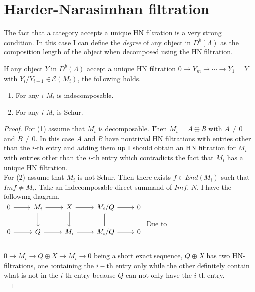 \section{Harder-Narasimhan filtration}
\indent The fact that a category accepts a unique HN filtration is a very strong condition. In this case I can define the \textit{degree} of any object in $D^b(\Lambda)$ as the composition length of the object when decomposed using the HN filtration.\\
\begin{lemma}
If any object $Y$ in $D^b(\Lambda)$ accept a unique HN filtration $0\to Y_m\to\cdots\to Y_1=Y$ with $Y_i/Y_{i+1}\in \mathcal{E}(M_i)$, the following holds.
\begin{enumerate}
\item For any $i$ $M_i$ is indecomposable.
\item For any $i$ $M_i$ is Schur.
\end{enumerate}
\end{lemma}
\begin{proof}
\indent For (1) assume that $M_i$ is decomposable. Then $M_i = A\oplus B$ with $A\neq 0$ and $B\neq 0$. In this case $A$ and $B$ have nontrivial HN filtrations with entries other than the $i$-th entry and adding them up I should obtain an HN filtration for $M_i$ with entries other than the $i$-th entry which contradicts the fact that $M_i$ has a unique HN filtration.\\
\indent For (2) assume that $M_i$ is not Schur. Then there exists $f\in End(M_i)$ such that $Im f\neq M_i$. Take an indecomposable direct summand of $Im f$, $N$. I have the following diagram.\\
$\begin{tikzcd}
0\arrow[r] & M_i\arrow[r]\arrow[d] & X\arrow[r]\arrow[d] & M_i/Q \arrow[r]\arrow[d,equal] & 0\\
0\arrow[r] & Q \arrow[r] & M_i\arrow[r] & M_i/Q \arrow[r] & 0\\
\end{tikzcd}$
\indent Due to $0\to M_i\to Q\oplus X\to M_i\to 0$ being a short exact sequence, $Q\oplus X$ has two HN-filtrations, one containing the $i-$th entry only while the other definitely contain what is not in the $i$-th entry because $Q$ can not only have the $i$-th entry.\\
\end{proof}

